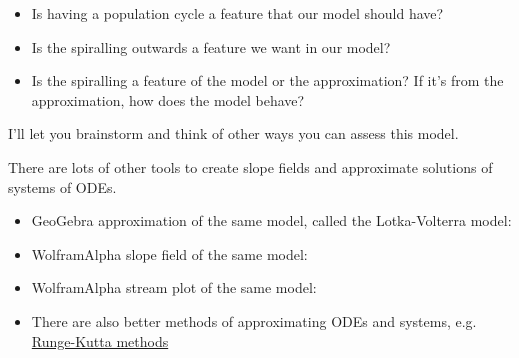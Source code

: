 \begin{example}
\begin{itemize}
	\item Is having a population cycle a feature that our model should have?
	\item Is the spiralling outwards a feature we want in our model?
	\item Is the spiralling a feature of the model or the approximation? If it's from the approximation, how does the model behave?
\end{itemize}

I'll let you brainstorm and think of other ways you can assess this model.
\end{example}

\begin{graybox}
There are lots of other tools to create slope fields and approximate solutions of systems of ODEs.

\begin{itemize}
	\item GeoGebra approximation of the same model, called the Lotka-Volterra model:
	
	\hfill {}
	
	\item WolframAlpha slope field of the same model:

	\hfill {}

	\item WolframAlpha stream plot of the same model:

	\hfill {}
	
	\item There are also better methods of approximating ODEs and systems, e.g. \href{https://en.wikipedia.org/wiki/Runge-Kutta_methods}{Runge-Kutta methods} 
	
	\hfill {}
\end{itemize}

\end{graybox}


%
%



